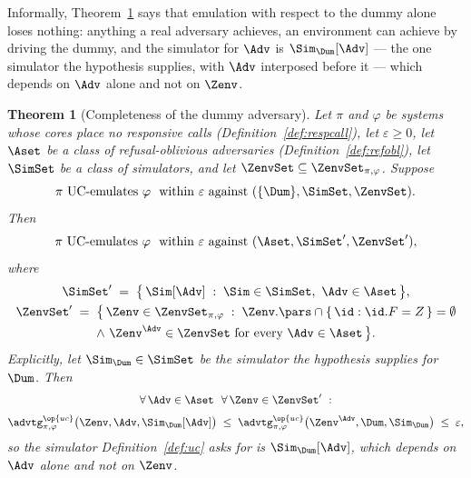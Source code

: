 \documentclass[10pt,oneside,openany]{book}
\theoremstyle{accentdef}
\theoremstyle{accentplain}
\newtheorem{theorem}[definition]{Theorem}
\begin{document}
Informally, Theorem~\ref{thm:dummy} says that emulation with respect to the dummy alone loses
nothing: anything a real adversary achieves, an environment can achieve by driving the dummy,
and the simulator for $\Adv$ is $\Sim_{\Dum}[\Adv]$ --- the one simulator the hypothesis
supplies, with $\Adv$ interposed before it --- which depends on $\Adv$ alone and not on $\Zenv$.

\begin{theorem}[Completeness of the dummy adversary]\label{thm:dummy}
Let $\pi$ and $\varphi$ be systems whose cores place no responsive calls
(Definition~\ref{def:respcall}), let $\varepsilon \geq 0$, let $\Aset$ be a class of
refusal-oblivious adversaries (Definition~\ref{def:refobl}),
let $\SimSet$ be a class of simulators, and let $\ZenvSet \subseteq \ZenvSet_{\pi,\varphi}$.
Suppose
\[
  \pi \ \text{UC-emulates} \ \varphi \ \text{ within } \varepsilon \text{ against } (\{\Dum\},\SimSet,\ZenvSet) .
\]
Then
\[
  \pi \ \text{UC-emulates} \ \varphi \ \text{ within } \varepsilon \text{ against } (\Aset,\SimSet',\ZenvSet') ,
\]
where
\begin{gather*}
  \SimSet' \;=\; \bigl\{\, \Sim[\Adv] \;:\; \Sim \in \SimSet,\ \Adv \in \Aset \,\bigr\},
  \\
  \ZenvSet' \;=\; \bigl\{\, \Zenv \in \ZenvSet_{\pi,\varphi} \;:\;
  \Zenv.\pars \cap \{\, \id : \id.F = Z \,\} = \emptyset \\
  \wedge\ \Zenv^{\Adv} \in \ZenvSet \ \text{for every } \Adv \in \Aset \,\bigr\} .
\end{gather*}
Explicitly, let $\Sim_{\Dum} \in \SimSet$ be the simulator the hypothesis supplies for $\Dum$. Then
\[
  \begin{gathered}
  \forall\, \Adv \in \Aset \ \ \forall\, \Zenv \in \ZenvSet' \ : \\[3pt]
  \advtg^{\op{uc}}_{\pi,\varphi}\bigl(\Zenv,\Adv,\Sim_{\Dum}[\Adv]\bigr)
  \;\leq\;
  \advtg^{\op{uc}}_{\pi,\varphi}\bigl(\Zenv^{\Adv},\Dum,\Sim_{\Dum}\bigr)
  \;\leq\; \varepsilon ,
  \end{gathered}
\]
so the simulator Definition~\ref{def:uc} asks for is $\Sim_{\Dum}[\Adv]$, which depends on $\Adv$
alone and not on $\Zenv$.
\end{theorem}
\end{document}
